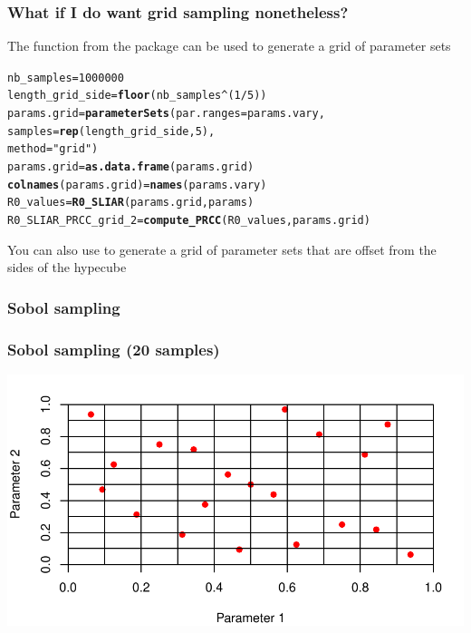 \documentclass[aspectratio=169]{beamer}\usepackage[]{graphicx}\usepackage[]{xcolor}
\makeatletter
\def\maxwidth{ %
  \ifdim\Gin@nat@width>\linewidth
    \linewidth
  \else
    \Gin@nat@width
  \fi
}
\newcommand{\hlnum}[1]{\textcolor[rgb]{0.686,0.059,0.569}{#1}}%
\newcommand{\hlsng}[1]{\textcolor[rgb]{0.192,0.494,0.8}{#1}}%
\newcommand{\hlopt}[1]{\textcolor[rgb]{0,0,0}{#1}}%
\newcommand{\hldef}[1]{\textcolor[rgb]{0.345,0.345,0.345}{#1}}%
\newcommand{\hlkwb}[1]{\textcolor[rgb]{0.69,0.353,0.396}{#1}}%
\newcommand{\hlkwc}[1]{\textcolor[rgb]{0.333,0.667,0.333}{#1}}%
\newcommand{\hlkwd}[1]{\textcolor[rgb]{0.737,0.353,0.396}{\textbf{#1}}}%
\newenvironment{kframe}{%
 \def\at@end@of@kframe{}%
 \ifinner\ifhmode%
  \def\at@end@of@kframe{\end{minipage}}%
  \begin{minipage}{\columnwidth}%
 \fi\fi%
 \def\FrameCommand##1{\hskip\@totalleftmargin \hskip-\fboxsep
 \colorbox{shadecolor}{##1}\hskip-\fboxsep
     \hskip-\linewidth \hskip-\@totalleftmargin \hskip\columnwidth}%
 \MakeFramed {\advance\hsize-\width
   \@totalleftmargin\z@ \linewidth\hsize
   \@setminipage}}%
 {\par\unskip\endMakeFramed%
 \at@end@of@kframe}
\newenvironment{knitrout}{}{} %
\makeatother
\begin{document}
\begin{frame}[fragile]\frametitle{What if I do want grid sampling nonetheless?}
The function  from the  package can be used to generate a grid of parameter sets
\vfill
\begin{knitrout}
\color{fgcolor}\begin{kframe}
\begin{alltt}
\hldef{nb_samples} \hlkwb{=} \hlnum{1000000}
\hldef{length_grid_side} \hlkwb{=} \hlkwd{floor}\hldef{(nb_samples}\hlopt{^}\hldef{(}\hlnum{1}\hlopt{/}\hlnum{5}\hldef{))}
\hldef{params.grid} \hlkwb{=} \hlkwd{parameterSets}\hldef{(}\hlkwc{par.ranges} \hldef{= params.vary,}
                             \hlkwc{samples} \hldef{=} \hlkwd{rep}\hldef{(length_grid_side,} \hlnum{5}\hldef{),}
                             \hlkwc{method} \hldef{=} \hlsng{"grid"}\hldef{)}
\hldef{params.grid} \hlkwb{=} \hlkwd{as.data.frame}\hldef{(params.grid)}
\hlkwd{colnames}\hldef{(params.grid)} \hlkwb{=} \hlkwd{names}\hldef{(params.vary)}
\hldef{R0_values} \hlkwb{=} \hlkwd{R0_SLIAR}\hldef{(params.grid, params)}
\hldef{R0_SLIAR_PRCC_grid_2} \hlkwb{=} \hlkwd{compute_PRCC}\hldef{(R0_values, params.grid)}
\end{alltt}
\end{kframe}
\end{knitrout}
\vfill
You can also use  to generate a grid of parameter sets that are offset from the sides of the hypecube
\end{frame}



\subsubsection{Sobol sampling}


\begin{frame}[fragile]\frametitle{Sobol sampling (20 samples)}
\begin{knitrout}
\color{fgcolor}
\includegraphics[width=\maxwidth]{FIGS/comp-analysis-sobol-sampling-2d-example-1} 
\end{knitrout}
\end{frame}
\end{document}
